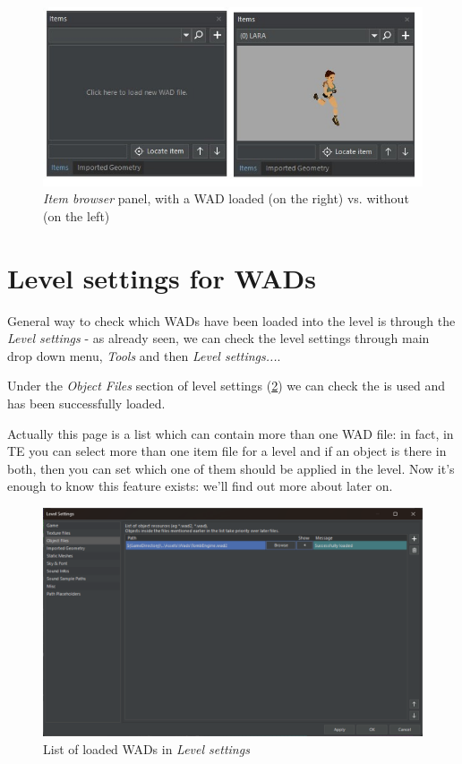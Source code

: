 \begin{figure}
    \centering
     \includegraphics[width=1\textwidth]{screenshots/12.jpg}
     \caption{\emph{Item browser} panel, with a WAD loaded (on the right) vs. without (on the left)}
     \label{fig:TEItemBrowser} 
\end{figure}

\section {Level settings for WADs}

General way to check which WADs have been loaded into the level is through the \emph{Level settings} - as already seen, we can check the level settings through main drop down menu, \emph{Tools} and then \emph{Level settings...}.
\par Under the \emph{Object Files} section of level settings (\ref{fig:TEWADSettings}) we can check the  is used and has been successfully loaded.
\par Actually this page is a list which can contain more than one WAD file: in fact, in TE you can select more than one item file for a level and if an object is there in both, then you can set which one of them should be applied in the level. Now it's enough to know this feature exists: we'll find out more about later on.

\begin{figure}
    \centering
     \includegraphics[width=1\textwidth]{screenshots/1004.png}
     \caption{List of loaded WADs in \emph{Level settings}}
     \label{fig:TEWADSettings} 
\end{figure}

